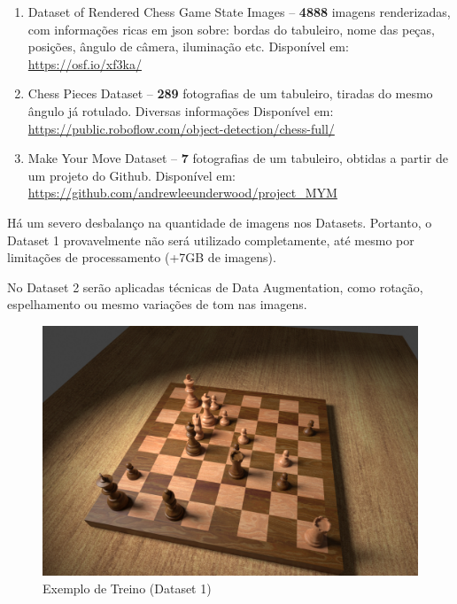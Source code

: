 \documentclass[a4paper,12pt,twoside]{article}
\begin{document}
\begin{enumerate}
    \item{Dataset of Rendered Chess Game State Images –
          \textbf{4888} imagens renderizadas, com informações ricas em json sobre: bordas do tabuleiro, nome das peças, posições, ângulo de câmera, iluminação etc.
                        Disponível em: \url{https://osf.io/xf3ka/}}
    \item{Chess Pieces Dataset –
          \textbf{289} fotografias de um tabuleiro, tiradas do mesmo ângulo já rotulado. Diversas informações
                        Disponível em: \url{https://public.roboflow.com/object-detection/chess-full/}}
    \item{Make Your Move Dataset –
          \textbf{7} fotografias de um tabuleiro, obtidas a partir de um projeto do Github.
                        Disponível em: \url{https://github.com/andrewleeunderwood/project\_MYM}}
\end{enumerate}

Há um severo desbalanço na quantidade de imagens nos Datasets.
Portanto, o Dataset 1 provavelmente não será utilizado completamente,
até mesmo por limitações de processamento (+7GB de imagens).

No Dataset 2 serão aplicadas técnicas de Data Augmentation,
como rotação, espelhamento ou mesmo variações de tom nas imagens.

\begin{figure}[h!]
\centering
  \includegraphics[width=\linewidth]{fig/treino.jpg}
\caption{Exemplo de Treino (Dataset 1)}
\label{fig:treino}
\end{figure}
\end{document}
